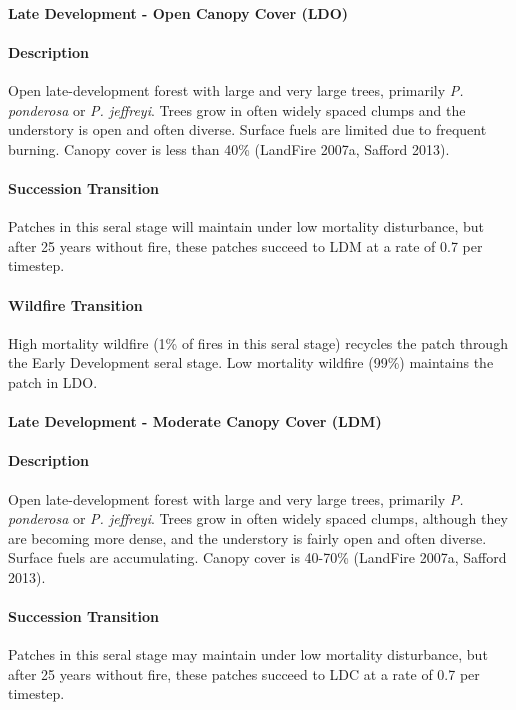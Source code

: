 \noindent\hrulefill


\paragraph{Late Development - Open Canopy Cover (LDO)}

\paragraph{Description} Open late-development forest with large and very large trees, primarily \emph{P. ponderosa} or \emph{P. jeffreyi}. Trees grow in often widely spaced clumps and the understory is open and often diverse. Surface fuels are limited due to frequent burning. Canopy cover is less than 40\% (LandFire 2007a, Safford 2013).

\paragraph{Succession Transition} Patches in this seral stage will maintain under low mortality disturbance, but after 25 years without fire, these patches succeed to LDM at a rate of 0.7 per timestep.

\paragraph{Wildfire Transition} High mortality wildfire (1\% of fires in this seral stage) recycles the patch through the Early Development seral stage. Low mortality wildfire (99\%) maintains the patch in LDO.

\noindent\hrulefill

\paragraph{Late Development - Moderate Canopy Cover (LDM)}

\paragraph{Description} Open late-development forest with large and very large trees, primarily \emph{P. ponderosa} or \emph{P. jeffreyi}. Trees grow in often widely spaced clumps, although they are becoming more dense, and the understory is fairly open and often diverse. Surface fuels are accumulating. Canopy cover is 40-70\% (LandFire 2007a, Safford 2013).

\paragraph{Succession Transition} Patches in this seral stage may maintain under low mortality disturbance, but after 25 years without fire, these patches succeed to LDC at a rate of 0.7 per timestep.


